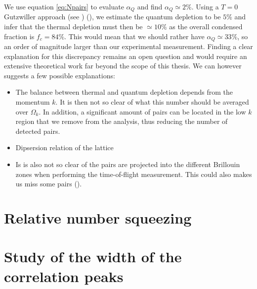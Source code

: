 We use equation \ref{eq:Npairs} to evaluate $\alpha_Q$ and find $\alpha_Q \simeq 2 \%$. Using a $T=0$ Gutzwiller approach (see \cite{bouton_these}) (), we estimate the quantum depletion to be $5\%$ and infer that the thermal depletion must then be $\simeq 10\%$ as the overall condensed fraction is $f_c=84 \%$. This would mean that we should rather have $\alpha_Q \simeq 33 \%$, so an order of magnitude larger than our experimental measurement. Finding a clear explanation for this discrepancy remains an open question and would require an extensive theoretical work far beyond the scope of this thesis. We can however suggests a few possible explanations:

\begin{itemize}
    \item The balance between thermal and quantum depletion depends from the momentum $k$. It is then not so clear of what this number should be averaged over $\Omega_k$. In addition, a significant amount of \kmk pairs can be located in the low $k$ region that we remove from the analysis, thus reducing the number of detected pairs.
    \item Dipsersion relation of the lattice 
    \item Is is also not so clear of the pairs are projected into the different Brillouin zones when performing the time-of-flight measurement. This could also makes us miss some pairs ().
\end{itemize}


\section{Relative number squeezing}

\section{Study of the width of the correlation peaks}

